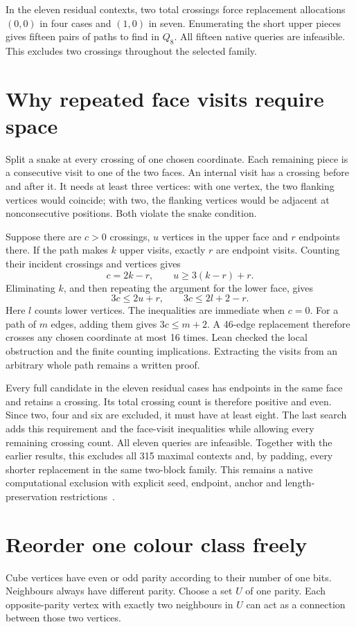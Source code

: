 \documentclass[11pt,a4paper]{article}
\begin{document}
In the eleven residual contexts, two total crossings force replacement
allocations $(0,0)$ in four cases and $(1,0)$ in seven. Enumerating the
short upper pieces gives fifteen pairs of paths to find in $Q_8$.
All fifteen native queries are infeasible. This excludes two crossings
throughout the selected family.

\section{Why repeated face visits require space}
Split a snake at every crossing of one chosen coordinate. Each remaining
piece is a consecutive visit to one of the two faces. An internal visit
has a crossing before and after it. It needs at least three vertices:
with one vertex, the two flanking vertices would coincide; with two,
the flanking vertices would be adjacent at nonconsecutive positions.
Both violate the snake condition.

Suppose there are $c>0$ crossings, $u$ vertices in the upper face and
$r$ endpoints there. If the path makes $k$ upper visits, exactly $r$
are endpoint visits. Counting their incident crossings and vertices gives
\[
c=2k-r,\qquad u\ge3(k-r)+r.
\]
Eliminating $k$, and then repeating the argument for the lower face, gives
\[
\boxed{3c\le2u+r,\qquad 3c\le2l+2-r.}
\]
Here $l$ counts lower vertices. The inequalities are immediate when
$c=0$. For a path of $m$ edges, adding them gives $3c\le m+2$.
A 46-edge replacement therefore crosses any chosen coordinate at most
16 times. Lean checked the local obstruction and the finite counting
implications. Extracting the visits from an arbitrary whole path remains
a written proof.

Every full candidate in the eleven residual cases has endpoints in the
same face and retains a crossing. Its total crossing count is therefore
positive and even. Since two, four and six are excluded, it must have at
least eight. The last search adds this requirement and the face-visit
inequalities while allowing every remaining crossing count.
All eleven queries are infeasible. Together with the earlier results,
this excludes all 315 maximal contexts and, by padding, every shorter
replacement in the same two-block family. This remains a native
computational exclusion with explicit seed, endpoint, anchor and
length-preservation restrictions~\cite{research230}.

\section{Reorder one colour class freely}
Cube vertices have even or odd parity according to their number of one
bits. Neighbours always have different parity. Choose a set $U$ of one
parity. Each opposite-parity vertex with exactly two neighbours in $U$
can act as a connection between those two vertices.
\end{document}
